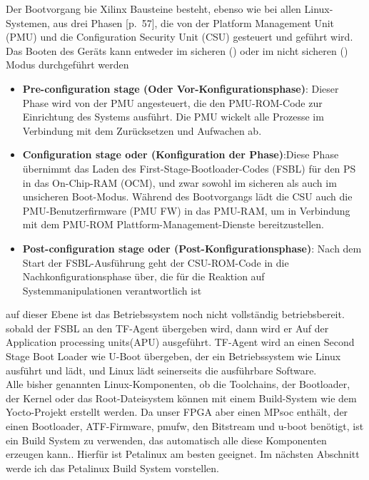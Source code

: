 Der Bootvorgang bie Xilinx Bausteine besteht, ebenso wie bei allen Linux-Systemen, aus drei Phasen \cite{Xilinx2017}[p.~57], die von der Platform Management Unit (PMU) und die Configuration Security Unit (CSU) gesteuert und geführt wird. Das Booten des Geräts kann entweder im sicheren () oder im nicht sicheren () Modus durchgeführt werden 
\begin{itemize}
	\item \textbf{Pre-configuration stage (Oder Vor-Konfigurationsphase)}: Dieser Phase wird von der PMU angesteuert, die den PMU-ROM-Code zur Einrichtung des Systems ausführt. Die PMU wickelt alle Prozesse im Verbindung mit dem Zurücksetzen und Aufwachen ab.
	\item \textbf{Configuration stage oder (Konfiguration der Phase)}:Diese Phase übernimmt das Laden des First-Stage-Bootloader-Codes (FSBL) für den PS in das On-Chip-RAM (OCM), und zwar sowohl im sicheren als auch im unsicheren Boot-Modus. Während des Bootvorgangs lädt die CSU auch die PMU-Benutzerfirmware (PMU FW) in das PMU-RAM, um in Verbindung mit dem PMU-ROM Plattform-Management-Dienste bereitzustellen.
	\item \textbf{Post-configuration stage oder (Post-Konfigurationsphase)}: Nach dem Start der FSBL-Ausführung geht der CSU-ROM-Code in die Nachkonfigurationsphase über, die für die Reaktion auf Systemmanipulationen verantwortlich ist
\end{itemize}

auf dieser Ebene ist das Betriebssystem noch nicht vollständig betriebsbereit. sobald der FSBL an den TF-Agent übergeben wird, dann wird er Auf der Application processing units(APU) ausgeführt. TF-Agent wird an einen Second Stage Boot Loader wie U-Boot übergeben, der ein Betriebssystem wie Linux ausführt und lädt, und Linux lädt seinerseits die ausführbare Software.\\
Alle bisher genannten Linux-Komponenten, ob die Toolchains, der Bootloader, der Kernel oder das Root-Dateisystem können mit einem Build-System wie dem Yocto-Projekt erstellt werden. Da unser FPGA aber einen MPsoc enthält, der einen Bootloader, ATF-Firmware, pmufw, den Bitstream und u-boot benötigt, ist ein Build System zu verwenden, das automatisch alle diese Komponenten erzeugen kann.. Hierfür ist Petalinux am besten geeignet. Im nächsten Abschnitt werde ich das Petalinux Build System vorstellen. 


